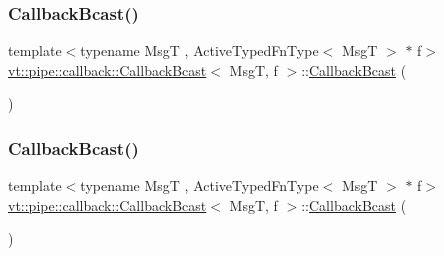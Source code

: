\subsubsection{\texorpdfstring{Callback\+Bcast()}{CallbackBcast()}\hspace{0.1cm}{\footnotesize\ttfamily [2/4]}}
{\footnotesize\ttfamily template$<$typename MsgT , Active\+Typed\+Fn\+Type$<$ Msg\+T $>$ $\ast$ f$>$ \\
\hyperlink{structvt_1_1pipe_1_1callback_1_1_callback_bcast}{vt\+::pipe\+::callback\+::\+Callback\+Bcast}$<$ MsgT, f $>$\+::\hyperlink{structvt_1_1pipe_1_1callback_1_1_callback_bcast}{Callback\+Bcast} (\begin{DoxyParamCaption}\item[{\hyperlink{structvt_1_1pipe_1_1callback_1_1_callback_bcast}{Callback\+Bcast}$<$ MsgT, f $>$ const \&}]{ }\end{DoxyParamCaption})\hspace{0.3cm}{\ttfamily [default]}}

\mbox{\label{structvt_1_1pipe_1_1callback_1_1_callback_bcast_af90721bd868d3d3e4140db4bee5da39f}} 
\subsubsection{\texorpdfstring{Callback\+Bcast()}{CallbackBcast()}\hspace{0.1cm}{\footnotesize\ttfamily [3/4]}}
{\footnotesize\ttfamily template$<$typename MsgT , Active\+Typed\+Fn\+Type$<$ Msg\+T $>$ $\ast$ f$>$ \\
\hyperlink{structvt_1_1pipe_1_1callback_1_1_callback_bcast}{vt\+::pipe\+::callback\+::\+Callback\+Bcast}$<$ MsgT, f $>$\+::\hyperlink{structvt_1_1pipe_1_1callback_1_1_callback_bcast}{Callback\+Bcast} (\begin{DoxyParamCaption}\item[{\hyperlink{structvt_1_1pipe_1_1callback_1_1_callback_bcast}{Callback\+Bcast}$<$ MsgT, f $>$ \&\&}]{ }\end{DoxyParamCaption})\hspace{0.3cm}{\ttfamily [default]}}

\mbox{\label{structvt_1_1pipe_1_1callback_1_1_callback_bcast_a57451443d73bc8cc4deb3649ec61a776}} 
